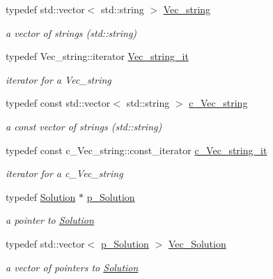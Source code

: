 \begin{DoxyCompactItemize}
typedef std\+::vector$<$ std\+::string $>$ \mbox{\hyperlink{group___s_m_s__types_ga36068d46bc6e7ba661efe0093c7a8beb}{Vec\+\_\+string}}
\begin{DoxyCompactList}\small\item\em a vector of strings (std\+::string) \end{DoxyCompactList}\item 
typedef Vec\+\_\+string\+::iterator \mbox{\hyperlink{group___s_m_s__types_ga783dae6575f12fd7e90ad2edbf10f55c}{Vec\+\_\+string\+\_\+it}}
\begin{DoxyCompactList}\small\item\em iterator for a Vec\+\_\+string \end{DoxyCompactList}\item 
typedef const std\+::vector$<$ std\+::string $>$ \mbox{\hyperlink{group___s_m_s__types_ga4eb8b5e087882b48fc77ba2a18267301}{c\+\_\+\+Vec\+\_\+string}}
\begin{DoxyCompactList}\small\item\em a const vector of strings (std\+::string) \end{DoxyCompactList}\item 
typedef const c\+\_\+\+Vec\+\_\+string\+::const\+\_\+iterator \mbox{\hyperlink{group___s_m_s__types_ga8d4579faf0785546f32b06f7416059f5}{c\+\_\+\+Vec\+\_\+string\+\_\+it}}
\begin{DoxyCompactList}\small\item\em iterator for a c\+\_\+\+Vec\+\_\+string \end{DoxyCompactList}\item 
typedef \mbox{\hyperlink{class_s_m_spp__di__unipi__it_1_1_solution}{Solution}} $\ast$ \mbox{\hyperlink{group___solution___t_y_p_e_s_gacf92307e1f131aad6b620a78280b747c}{p\+\_\+\+Solution}}
\begin{DoxyCompactList}\small\item\em a pointer to \mbox{\hyperlink{class_s_m_spp__di__unipi__it_1_1_solution}{Solution}} \end{DoxyCompactList}\item 
typedef std\+::vector$<$ \mbox{\hyperlink{group___solution___t_y_p_e_s_gacf92307e1f131aad6b620a78280b747c}{p\+\_\+\+Solution}} $>$ \mbox{\hyperlink{group___solution___t_y_p_e_s_ga904641293a6189c2fd8ecc0ba8cec4c8}{Vec\+\_\+\+Solution}}
\begin{DoxyCompactList}\small\item\em a vector of pointers to \mbox{\hyperlink{class_s_m_spp__di__unipi__it_1_1_solution}{Solution}} \end{DoxyCompactList}\item 

\end{DoxyCompactItemize}
